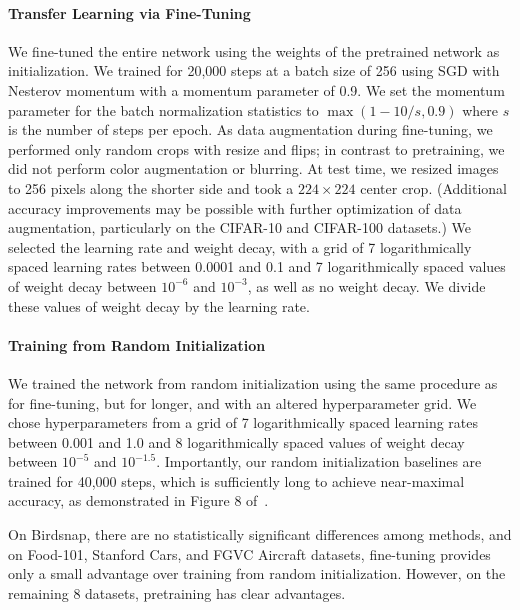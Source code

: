 \documentclass{article}
\begin{document}
\paragraph{Transfer Learning via Fine-Tuning} We fine-tuned the entire network using the weights of the pretrained network as initialization. We trained for 20,000 steps at a batch size of 256 using SGD with Nesterov momentum with a momentum parameter of 0.9. We set the momentum parameter for the batch normalization statistics to $\max(1 - 10/s, 0.9)$ where $s$ is the number of steps per epoch. As data augmentation during fine-tuning, we performed only random crops with resize and flips; in contrast to pretraining, we did not perform color augmentation or blurring. At test time, we resized images to 256 pixels along the shorter side and took a $224\times 224$ center crop. (Additional accuracy improvements may be possible with further optimization of data augmentation, particularly on the CIFAR-10 and CIFAR-100 datasets.) We selected the learning rate and weight decay, with a grid of 7 logarithmically spaced learning rates between 0.0001 and 0.1 and 7 logarithmically spaced values of weight decay between $10^{-6}$ and $10^{-3}$, as well as no weight decay. We divide these values of weight decay by the learning rate. 

\paragraph{Training from Random Initialization} We trained the network from random initialization using the same procedure as for fine-tuning, but for longer, and with an altered hyperparameter grid. We chose hyperparameters from a grid of 7 logarithmically spaced learning rates between 0.001 and 1.0 and 8 logarithmically spaced values of weight decay between $10^{-5}$ and $10^{-1.5}$. 
Importantly, our random initialization baselines are trained for 40,000 steps, which is sufficiently long to achieve near-maximal accuracy, as demonstrated in Figure 8 of~\citet{kornblith2019better}.



On Birdsnap, there are no statistically significant differences among methods, and on Food-101, Stanford Cars, and FGVC Aircraft datasets, fine-tuning provides only a small advantage over training from random initialization. However, on the remaining 8 datasets, pretraining has clear advantages.
\end{document}
